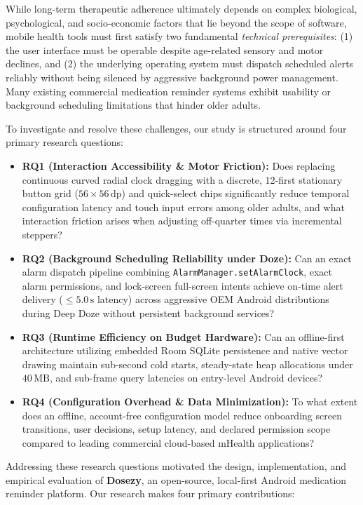 \documentclass[11pt,a4paper]{article}
\begin{document}
While long-term therapeutic adherence ultimately depends on complex biological, psychological, and socio-economic factors that lie beyond the scope of software, mobile health tools must first satisfy two fundamental \emph{technical prerequisites}: (1) the user interface must be operable despite age-related sensory and motor declines, and (2) the underlying operating system must dispatch scheduled alerts reliably without being silenced by aggressive background power management. Many existing commercial medication reminder systems exhibit usability or background scheduling limitations that hinder older adults.

To investigate and resolve these challenges, our study is structured around four primary research questions:
\begin{itemize}[leftmargin=*]
    \item \textbf{RQ1 (Interaction Accessibility \& Motor Friction):} Does replacing continuous curved radial clock dragging with a discrete, 12-first stationary button grid ($56\times56\,\text{dp}$) and quick-select chips significantly reduce temporal configuration latency and touch input errors among older adults, and what interaction friction arises when adjusting off-quarter times via incremental steppers?
    \item \textbf{RQ2 (Background Scheduling Reliability under Doze):} Can an exact alarm dispatch pipeline combining \texttt{AlarmManager.setAlarmClock}, exact alarm permissions, and lock-screen full-screen intents achieve on-time alert delivery ($\le 5.0\,\text{s}$ latency) across aggressive OEM Android distributions during Deep Doze without persistent background services?
    \item \textbf{RQ3 (Runtime Efficiency on Budget Hardware):} Can an offline-first architecture utilizing embedded Room SQLite persistence and native vector drawing maintain sub-second cold starts, steady-state heap allocations under $40\,\text{MB}$, and sub-frame query latencies on entry-level Android devices?
    \item \textbf{RQ4 (Configuration Overhead \& Data Minimization):} To what extent does an offline, account-free configuration model reduce onboarding screen transitions, user decisions, setup latency, and declared permission scope compared to leading commercial cloud-based mHealth applications?
\end{itemize}

Addressing these research questions motivated the design, implementation, and empirical evaluation of \textbf{Dosezy}, an open-source, local-first Android medication reminder platform. Our research makes four primary contributions:
\end{document}
